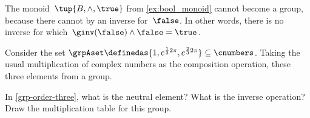 \begin{example}
  The monoid~$\tup{B,\wedge, \true}$ from \cref{ex:bool_monoid} cannot become a group, because there cannot by an inverse for~$\false$. In other words, there is no inverse for which~$\ginv(\false)\wedge \false=\true$.
\end{example}
\begin{example}
  \label{grp-order-three}
  Consider the set $\grpAset \definedas \{ 1, e^{\frac{1}{3} 2 \pi}, e^{\frac{2 }{3} 2 \pi}  \} \subseteq \cnumbers$.
  Taking the usual multiplication of complex numbers as the composition operation, these three elements from a group.
\end{example}

\begin{exercise}
  In \cref{grp-order-three}, what is the neutral element? What is the inverse operation?
  Draw the multiplication table for this group.
\end{exercise}

\begin{solution}
\end{solution}



